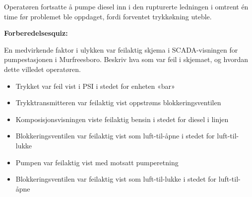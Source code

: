 Operatøren fortsatte å pumpe diesel inn i den rupturerte ledningen i omtrent én time før problemet ble oppdaget, fordi forventet trykkøkning uteble.

\vfil \eject

\noindent
{\bf Forberedelsesquiz:}

En medvirkende faktor i ulykken var feilaktig skjema i SCADA-visningen for pumpestasjonen i Murfreesboro. Beskriv hva som var feil i skjemaet, og hvordan dette villedet operatøren.

\begin{itemize}
\item{} Trykket var feil vist i PSI i stedet for enheten «bar»
\vskip 5pt
\item{} Trykktransmitteren var feilaktig vist oppstrøms blokkeringsventilen
\vskip 5pt
\item{} Komposisjonsvisningen viste feilaktig bensin i stedet for diesel i linjen
\vskip 5pt
\item{} Blokkeringsventilen var feilaktig vist som luft-til-åpne i stedet for luft-til-lukke
\vskip 5pt
\item{} Pumpen var feilaktig vist med motsatt pumperetning
\vskip 5pt
\item{} Blokkeringsventilen var feilaktig vist som luft-til-lukke i stedet for luft-til-åpne
\end{itemize}





